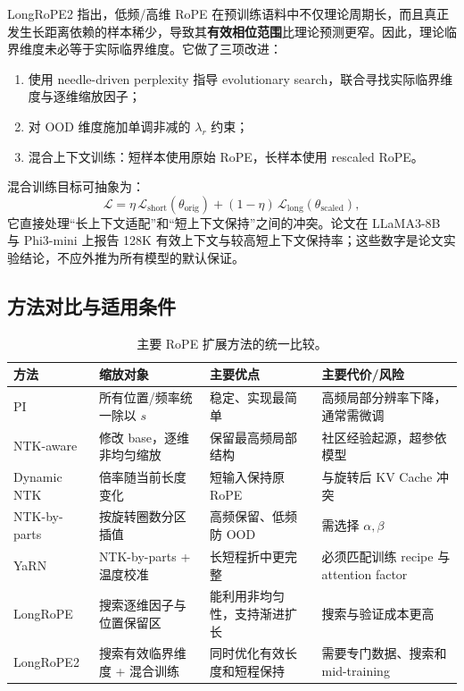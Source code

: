\documentclass[UTF8,fontset=none,a4paper,10pt]{ctexart}
\newcommand{\term}[1]{\textbf{#1}}
\begin{document}
LongRoPE2 指出，低频/高维 RoPE 在预训练语料中不仅理论周期长，而且真正发生长距离依赖的样本稀少，导致其\term{有效相位范围}比理论预测更窄\cite{zh:longrope2}。因此，理论临界维度未必等于实际临界维度。它做了三项改进：
\begin{enumerate}
  \item 使用 needle-driven perplexity 指导 evolutionary search，联合寻找实际临界维度与逐维缩放因子；
  \item 对 OOD 维度施加单调非减的 $\lambda_r$ 约束；
  \item 混合上下文训练：短样本使用原始 RoPE，长样本使用 rescaled RoPE。
\end{enumerate}
混合训练目标可抽象为：
\begin{equation}
  \mathcal{L}=\eta\,\mathcal{L}_{\mathrm{short}}(\theta_{\mathrm{orig}})
  +(1-\eta)\,\mathcal{L}_{\mathrm{long}}(\theta_{\mathrm{scaled}}),
  \label{zh:eq:mixed-context-loss}
\end{equation}
它直接处理“长上下文适配”和“短上下文保持”之间的冲突。论文在 LLaMA3-8B 与 Phi3-mini 上报告 128K 有效上下文与较高短上下文保持率；这些数字是论文实验结论，不应外推为所有模型的默认保证\cite{zh:longrope2}。

\subsection{方法对比与适用条件}

\begin{table}[htbp]
\centering
\small
\begin{tabularx}{\linewidth}{@{}p{2.4cm}p{3.0cm}p{3.2cm}X@{}}
\toprule
方法 & 缩放对象 & 主要优点 & 主要代价/风险 \\
\midrule
PI & 所有位置/频率统一除以 $s$ & 稳定、实现最简单 & 高频局部分辨率下降，通常需微调 \\
NTK-aware & 修改 base，逐维非均匀缩放 & 保留最高频局部结构 & 社区经验起源，超参依模型 \\
Dynamic NTK & 倍率随当前长度变化 & 短输入保持原 RoPE & 与旋转后 KV Cache 冲突 \\
NTK-by-parts & 按旋转圈数分区插值 & 高频保留、低频防 OOD & 需选择 $\alpha,\beta$ \\
YaRN & NTK-by-parts + 温度校准 & 长短程折中更完整 & 必须匹配训练 recipe 与 attention factor \\
LongRoPE & 搜索逐维因子与位置保留区 & 能利用非均匀性，支持渐进扩长 & 搜索与验证成本更高 \\
LongRoPE2 & 搜索有效临界维度 + 混合训练 & 同时优化有效长度和短程保持 & 需要专门数据、搜索和 mid-training \\
\bottomrule
\end{tabularx}
\caption{主要 RoPE 扩展方法的统一比较。}
\label{zh:tab:rope-scaling}
\end{table}
\end{document}
